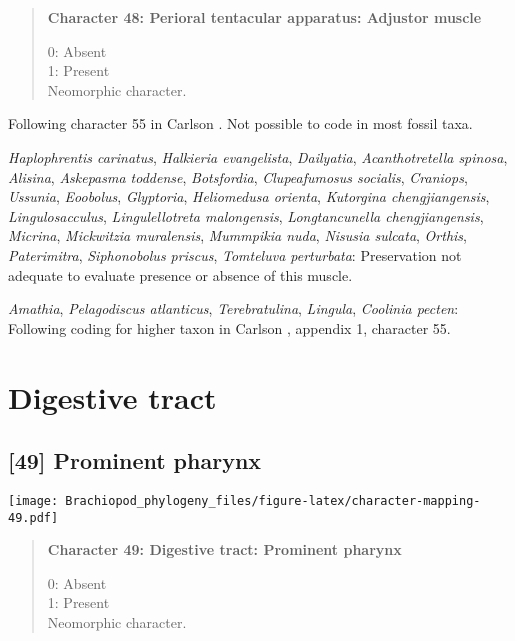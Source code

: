 \documentclass[openany]{book}
\theoremstyle{definition}
\theoremstyle{definition}
\theoremstyle{definition}
\theoremstyle{remark}
\begin{document}
\begin{quote}
\textbf{Character 48: Perioral tentacular apparatus: Adjustor muscle}

0: Absent\\
1: Present\\
Neomorphic character.
\end{quote}

Following character 55 in Carlson
\citeyearpar{Carlson1995Phylogeneticrelationships}. Not possible to code
in most fossil taxa.

\hypertarget{Acanthotretella_spinosa-coding-48}{}
\emph{Haplophrentis carinatus}, \emph{Halkieria evangelista},
\emph{Dailyatia}, \emph{Acanthotretella spinosa}, \emph{Alisina},
\emph{Askepasma toddense}, \emph{Botsfordia}, \emph{Clupeafumosus
socialis}, \emph{Craniops}, \emph{Ussunia}, \emph{Eoobolus},
\emph{Glyptoria}, \emph{Heliomedusa orienta}, \emph{Kutorgina
chengjiangensis}, \emph{Lingulosacculus}, \emph{Lingulellotreta
malongensis}, \emph{Longtancunella chengjiangensis}, \emph{Micrina},
\emph{Mickwitzia muralensis}, \emph{Mummpikia nuda}, \emph{Nisusia
sulcata}, \emph{Orthis}, \emph{Paterimitra}, \emph{Siphonobolus
priscus}, \emph{Tomteluva perturbata}: Preservation not adequate to
evaluate presence or absence of this muscle.

\hypertarget{Amathia-coding-48}{}
\emph{Amathia}, \emph{Pelagodiscus atlanticus}, \emph{Terebratulina},
\emph{Lingula}, \emph{Coolinia pecten}: Following coding for higher
taxon in Carlson \citeyearpar{Carlson1995Phylogeneticrelationships},
appendix 1, character 55.

\section{Digestive tract}\label{digestive-tract}

\subsection*{{[}49{]} Prominent pharynx}\label{prominent-pharynx}

\texttt{[image: Brachiopod\_phylogeny\_files/figure-latex/character-mapping-49.pdf]}

\begin{quote}
\textbf{Character 49: Digestive tract: Prominent pharynx}

0: Absent\\
1: Present\\
Neomorphic character.
\end{quote}
\end{document}
